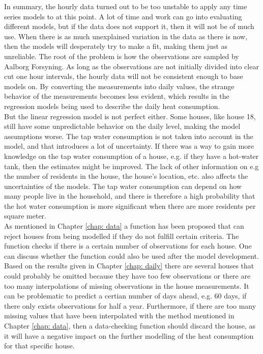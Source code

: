 \noindent In summary, the hourly data turned out to be too unstable to apply any time series models to at this point. A lot of time and work can go into evaluating different models, but if the data does not support it, then it will not be of much use. When there is as much unexplained variation in the data as there is now, then the models will desperately try to make a fit, making them just as unreliable. The root of the problem is how the observations are sampled by Aalborg Forsyning. As long as the observations are not initially divided into clear cut one hour intervals, the hourly data will not be consistent enough to base models on. By converting the measurements into daily values, the strange behavior of the measurements becomes less evident, which results in the regression models being used to describe the daily heat consumption. \\

\noindent But the linear regression model is not perfect either. Some houses, like house 18, still have some unpredictable behavior on the daily level, making the model assumptions worse. The tap water consumption is not taken into account in the model, and that introduces a lot of uncertainty. If there was a way to gain more knowledge on the tap water consumption of a house, e.g. if they have a hot-water tank, then the estimates might be improved. The lack of other information on e.g the number of residents in the house, the house's location, etc. also affects the uncertainties of the models. The tap water consumption can depend on how many people live in the household, and there is therefore a high probability that the hot water consumption is more significant when there are more residents per square meter.\\

\noindent As mentioned in Chapter \ref{chap: data} a function has been proposed that can reject houses from being modelled if they do not fulfill certain criteria. The function checks if there is a certain number of observations for each house. One can discuss whether the function could also be used after the model development. Based on the results given in Chapter \ref{chap: daily} there are several houses that could probably be omitted because they have too few observations or there are too many interpolations of missing observations in the house measurements. It can be problematic to predict a certian number of days ahead, e.g. 60 days, if there only exists observations for half a year. Furthermore, if there are too many missing values ​​that have been interpolated with the method mentioned in Chapter \ref{chap: data}, then a data-checking function should discard the house, as it will have a negative impact on the further modelling of the heat consumption for that specific house. \\





